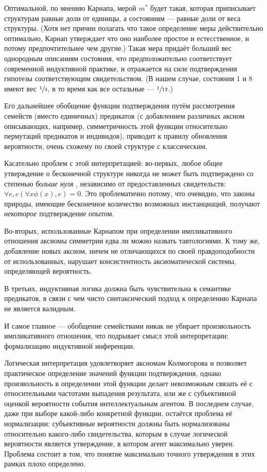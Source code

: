 \documentclass[14pt]{extarticle}
\begin{document}
Оптимальной, по мнению Карнапа, мерой $m^*$ будет такая, которая приписывает структурам равные доли от единицы, а состояниям --- равные доли от веса структуры. (Хотя нет причин полагать что такое определение меры действительно оптимально, Карнап утверждает что оно наиболее простое и естесственное, и потому предпочтительнее чем другие.) Такая мера придаёт больший вес однородным описаниям состояния, что предположительно соответствует современной индуктивной практике, и отражается на силе подтверждения гипотезы соответствующим свидетельством. (В нашем случае, состояния 1 и 8 имеют вес $\sfrac14$, в то время как все остальные --- $\sfrac{1}{12}$.)

Его дальнейшее обобщение функции подтверждения путём рассмотрения семейств (вместо единичных) предикатов (с добавлением различных аксиом описывающих, например, симметричность этой функции относительно пермутаций предикатов и индивидов), приводит к правилу обновления вероятности, очень схожему по своей структуре с классическим.

Касательно проблем с этой интерпретацией: во-первых, любое общее утверждение о бесконечной структуре никогда не может быть подтверждено со степенью \emph{больше нуля} , независимо от предоставленных свидетельств: $\forall e, c(\forall x\phi(x), e) = 0$. Это проблематично потому, что очевидно, что законы природы, имеющие бесконечное количество возможных инстанциаций, получают \emph{некоторое} подтверждение опытом. 

Во-вторых, использованные Карнапом при определении импликативного отношения аксиомы симметрии едва ли можно назвать тавтологиями. К тому же, добавление новых аксиом, ничем не отличающихся по своей правдоподобности от использованных, нарушает консистентность аксиоматической системы, определяющей вероятность.

В третьих, индуктивная логика должна быть чувствительна к семантике предикатов, в связи с чем чисто синтаксический подход к определению Карнапа не является валидным. 

И самое главное --- обобщение семействами никак не убирает произвольность импликативного отношения, что подрывает смысл этой интерпретации: формализацию индуктивной инференции.

Логическая интерпретация удовлетворяет аксиомам Колмогорова и позволяет практическое определение значений функции подтверждения, однако произвольность в определении этой функции делает невозможным связать её с относительными частотами выпадения результата, или же с субъективной оценкой вероятности события интеллектуальным агентом. В последнем случае, даже при выборе какой-либо конкретной функции, остаётся проблема её нормализации: субъективные вероятности должны быть нормализованы относительно какого-либо свидетельства, которым в случае логической вероятности является утверждение, в котором агент максимально уверен. Проблема состоит в том, что понятие максимально точного утверждения в этих рамках плохо определено.
\end{document}
